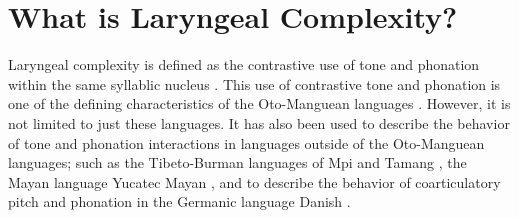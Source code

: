 \section{What is Laryngeal Complexity?}\label{sec:what_is_lc}

Laryngeal complexity is defined as the contrastive use of tone and phonation within the same syllablic nucleus \citep{blankenshipTimeCourseBreathiness1997,blankenshipTimingNonmodalPhonation2002,silvermanLaryngealComplexityOtomanguean1997,silvermanPhasingRecoverability1997}. This use of contrastive tone and phonation is one of the defining characteristics of the Oto-Manguean languages \citep{silvermanLaryngealComplexityOtomanguean1997}. However, it is not limited to just these languages. It has also been used to describe the behavior of tone and phonation interactions in languages outside of the Oto-Manguean languages; such as the Tibeto-Burman languages of Mpi and Tamang \citep{silvermanLaryngealComplexityOtomanguean1997,silvermanPhasingRecoverability1997}, the Mayan language Yucatec Mayan \citep{frazierPhoneticsYucatecMaya2013}, and to describe the behavior of coarticulatory pitch and phonation in the Germanic language Danish \citep{frazierPhoneticsYucatecMaya2013,penaStodTimingDomain2022,penaProductionPerceptionStod2024}.


